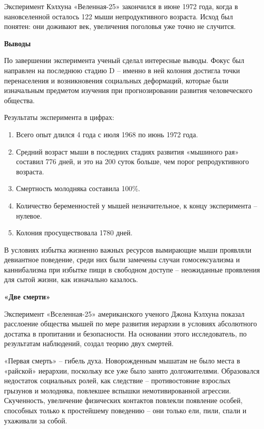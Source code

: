 Эксперимент Кэлхуна «Веленная-25» закончился в июне 1972 года, когда в нановселенной осталось 122 мыши непродуктивного возраста. Исход был понятен: они доживают век, увеличения поголовья уже точно не случится.


\textbf{Выводы}

По завершении эксперимента ученый сделал интересные выводы. Фокус был направлен на последнюю стадию D – именно в ней колония достигла точки перенаселения и возникновения социальных деформаций, которые были изначальным предметом изучения при прогнозировании развития человеческого общества.

\begin{fancyquotes}
    Результаты эксперимента в цифрах:

    \begin{enumerate}
        \item Всего опыт длился 4 года с июля 1968 по июнь 1972 года.
        \item Средний возраст мыши в последних стадиях развития «мышиного рая» составил 776 дней, и это на 200 суток больше, чем порог репродуктивного возраста.
        \item Смертность молодняка составила 100\%.
        \item Количество беременностей у мышей незначительное, к концу эксперимента – нулевое.
        \item Колония просуществовала 1780 дней.
    \end{enumerate}
\end{fancyquotes}

В условиях избытка жизненно важных ресурсов вымирающие мыши проявляли девиантное поведение, среди них были замечены случаи гомосексуализма и каннибализма при избытке пищи в свободном доступе – неожиданные проявления для сытой жизни, как изначально казалось.

\textbf{«Две смерти»}

Эксперимент «Вселенная-25» американского ученого Джона  Кэлхуна показал расслоение общества мышей по мере развития иерархии в условиях абсолютного достатка в пропитании и безопасности. На основании этого исследователь, по результатам наблюдений, создал теорию двух смертей.

«Первая смерть» – гибель духа. Новорожденным мышатам не было места в «райской» иерархии, поскольку все уже было занято долгожителями. Образовался недостаток социальных ролей, как следствие – противостояние взрослых грызунов и молодняка, повлекшее вспышки немотивированной агрессии. Скученность, увеличение физических контактов повлекли появление особей, способных только к простейшему поведению – они только ели, пили, спали и ухаживали за собой.

